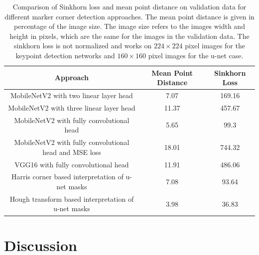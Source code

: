 \documentclass[10pt]{book}
\begin{document}
\begin{table}
  \begin{tabular}{ c c c }
   Approach & Mean Point Distance & Sinkhorn Loss \\ 
   \hline
   MobileNetV2 with two linear layer head        & 7.07 & 169.16 \\
   MobileNetV2 with three linear layer head      & 11.37 & 457.67 \\
   MobileNetV2 with fully convolutional head     & 5.65 & 99.3 \\
   MobileNetV2 with fully convolutional head and \ac{MSE} loss & 18.01 & 744.32 \\
   VGG16 with fully convolutional head           & 11.91 & 486.06 \\
   Harris corner based interpretation of u-net masks    & 7.08 & 93.64 \\
   Hough transform based interpretation of u-net masks  & 3.98 & 36.83 \\
   \hline
  \end{tabular}
  \caption{\label{tab:pet_valdata_results}Comparison of Sinkhorn loss and mean point distance on validation data for different marker corner detection approaches. The mean point distance is given in percentage of the image size. The image size refers to the images width and height in pixels, which are the same for the images in the validation data. The sinkhorn loss is not normalized and works on $224 \times 224$ pixel images for the keypoint detection networks and $160 \times 160$ pixel images for the u-net case. }
\end{table}

\section{Discussion}
\end{document}
